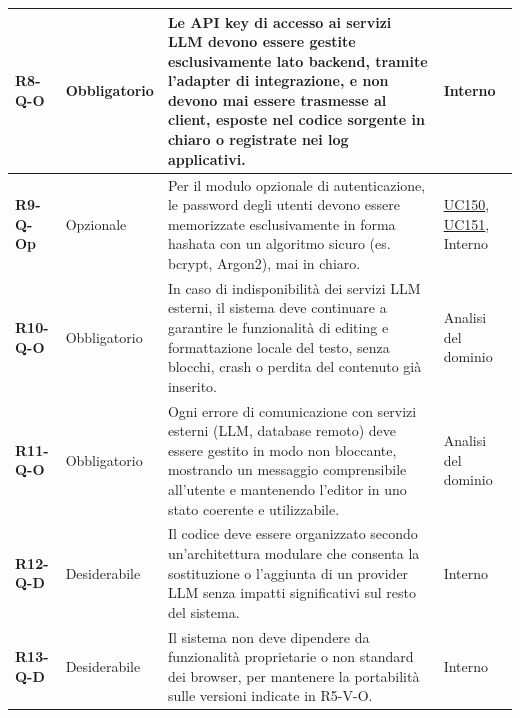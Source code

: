 \begin{longtable}{|p{2.5cm}|p{2.2cm}|p{6.8cm}|p{2.7cm}|}
	\textbf{R8-Q-O} & Obbligatorio & Le API key di accesso ai servizi LLM devono essere gestite esclusivamente lato backend, tramite l'adapter di integrazione, e non devono mai essere trasmesse al client, esposte nel codice sorgente in chiaro o registrate nei log applicativi. & Interno \\ \hline
	\textbf{R9-Q-Op} & Opzionale & Per il modulo opzionale di autenticazione, le password degli utenti devono essere memorizzate esclusivamente in forma hashata con un algoritmo sicuro (es. bcrypt, Argon2), mai in chiaro. & \hyperlink{uc150}{UC150}, \hyperlink{uc151}{UC151}, Interno \\ \hline

	\textbf{R10-Q-O} & Obbligatorio & In caso di indisponibilità dei servizi LLM esterni, il sistema deve continuare a garantire le funzionalità di editing e formattazione locale del testo, senza blocchi, crash o perdita del contenuto già inserito. & Analisi del dominio \\ \hline
	\textbf{R11-Q-O} & Obbligatorio & Ogni errore di comunicazione con servizi esterni (LLM, database remoto) deve essere gestito in modo non bloccante, mostrando un messaggio comprensibile all'utente e mantenendo l'editor in uno stato coerente e utilizzabile. & Analisi del dominio \\ \hline

	\textbf{R12-Q-D} & Desiderabile & Il codice deve essere organizzato secondo un'architettura modulare che consenta la sostituzione o l'aggiunta di un provider LLM senza impatti significativi sul resto del sistema. & Interno \\ \hline
	\textbf{R13-Q-D} & Desiderabile & Il sistema non deve dipendere da funzionalità proprietarie o non standard dei browser, per mantenere la portabilità sulle versioni indicate in R5-V-O. & Interno \\ \hline

\end{longtable}

